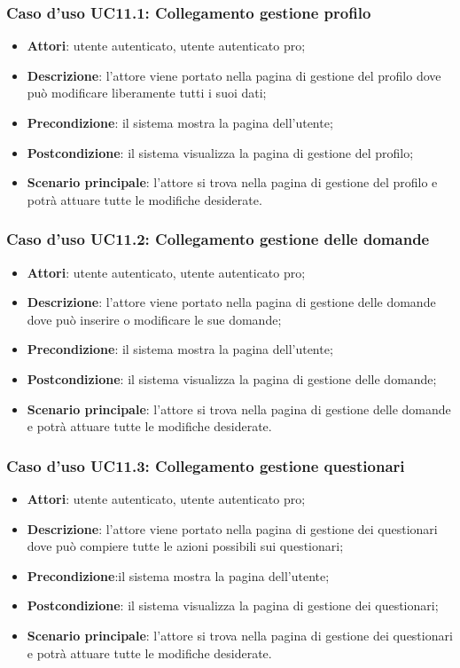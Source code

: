 \subsubsection{Caso d'uso UC11.1: Collegamento gestione profilo}
\begin{itemize}
\item\textbf{Attori}: utente autenticato, utente autenticato pro;
\item\textbf{Descrizione}: l'attore viene portato nella pagina di gestione del profilo dove può modificare liberamente tutti i suoi dati;
\item\textbf{Precondizione}: il sistema mostra la pagina dell'utente;
\item\textbf{Postcondizione}: il sistema visualizza la pagina di gestione del profilo;
\item\textbf{Scenario principale}: l'attore si trova nella pagina di gestione del profilo e potrà attuare tutte le modifiche desiderate.
\end{itemize}

\subsubsection{Caso d'uso UC11.2: Collegamento gestione delle domande}
\begin{itemize}
\item\textbf{Attori}: utente autenticato, utente autenticato pro;
\item\textbf{Descrizione}: l'attore viene portato nella pagina di gestione delle domande dove può inserire o modificare le sue domande;
\item\textbf{Precondizione}: il sistema mostra la pagina dell'utente;

\item\textbf{Postcondizione}: il sistema visualizza la pagina di gestione delle domande;
\item\textbf{Scenario principale}: l'attore si trova nella pagina di gestione delle domande e potrà attuare tutte le modifiche desiderate.
\end{itemize}

\subsubsection{Caso d'uso UC11.3: Collegamento gestione questionari}
\begin{itemize}
\item\textbf{Attori}: utente autenticato, utente autenticato pro;
\item\textbf{Descrizione}: l'attore viene portato nella pagina di gestione dei questionari dove può compiere tutte le azioni possibili sui questionari;
\item\textbf{Precondizione}:il sistema mostra la pagina dell'utente;
\item\textbf{Postcondizione}: il sistema visualizza la pagina di gestione dei questionari;
\item\textbf{Scenario principale}: l'attore si trova nella pagina di gestione dei questionari e potrà attuare tutte le modifiche desiderate.
\end{itemize}


